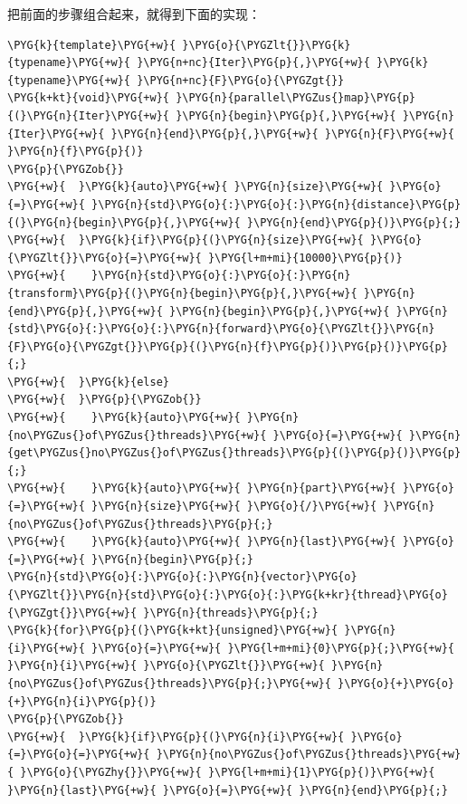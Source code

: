 
把前面的步骤组合起来，就得到下面的实现：



\begin{codeblockbg}
\begin{Verbatim}[commandchars=\\\{\},breaklines=true,breakanywhere=true,fontsize=\codefont,xleftmargin=17bp]
\PYG{k}{template}\PYG{+w}{ }\PYG{o}{\PYGZlt{}}\PYG{k}{typename}\PYG{+w}{ }\PYG{n+nc}{Iter}\PYG{p}{,}\PYG{+w}{ }\PYG{k}{typename}\PYG{+w}{ }\PYG{n+nc}{F}\PYG{o}{\PYGZgt{}}
\PYG{k+kt}{void}\PYG{+w}{ }\PYG{n}{parallel\PYGZus{}map}\PYG{p}{(}\PYG{n}{Iter}\PYG{+w}{ }\PYG{n}{begin}\PYG{p}{,}\PYG{+w}{ }\PYG{n}{Iter}\PYG{+w}{ }\PYG{n}{end}\PYG{p}{,}\PYG{+w}{ }\PYG{n}{F}\PYG{+w}{ }\PYG{n}{f}\PYG{p}{)}
\PYG{p}{\PYGZob{}}
\PYG{+w}{  }\PYG{k}{auto}\PYG{+w}{ }\PYG{n}{size}\PYG{+w}{ }\PYG{o}{=}\PYG{+w}{ }\PYG{n}{std}\PYG{o}{:}\PYG{o}{:}\PYG{n}{distance}\PYG{p}{(}\PYG{n}{begin}\PYG{p}{,}\PYG{+w}{ }\PYG{n}{end}\PYG{p}{)}\PYG{p}{;}
\PYG{+w}{  }\PYG{k}{if}\PYG{p}{(}\PYG{n}{size}\PYG{+w}{ }\PYG{o}{\PYGZlt{}}\PYG{o}{=}\PYG{+w}{ }\PYG{l+m+mi}{10000}\PYG{p}{)}
\PYG{+w}{    }\PYG{n}{std}\PYG{o}{:}\PYG{o}{:}\PYG{n}{transform}\PYG{p}{(}\PYG{n}{begin}\PYG{p}{,}\PYG{+w}{ }\PYG{n}{end}\PYG{p}{,}\PYG{+w}{ }\PYG{n}{begin}\PYG{p}{,}\PYG{+w}{ }\PYG{n}{std}\PYG{o}{:}\PYG{o}{:}\PYG{n}{forward}\PYG{o}{\PYGZlt{}}\PYG{n}{F}\PYG{o}{\PYGZgt{}}\PYG{p}{(}\PYG{n}{f}\PYG{p}{)}\PYG{p}{)}\PYG{p}{;}
\PYG{+w}{  }\PYG{k}{else}
\PYG{+w}{  }\PYG{p}{\PYGZob{}}
\PYG{+w}{    }\PYG{k}{auto}\PYG{+w}{ }\PYG{n}{no\PYGZus{}of\PYGZus{}threads}\PYG{+w}{ }\PYG{o}{=}\PYG{+w}{ }\PYG{n}{get\PYGZus{}no\PYGZus{}of\PYGZus{}threads}\PYG{p}{(}\PYG{p}{)}\PYG{p}{;}
\PYG{+w}{    }\PYG{k}{auto}\PYG{+w}{ }\PYG{n}{part}\PYG{+w}{ }\PYG{o}{=}\PYG{+w}{ }\PYG{n}{size}\PYG{+w}{ }\PYG{o}{/}\PYG{+w}{ }\PYG{n}{no\PYGZus{}of\PYGZus{}threads}\PYG{p}{;}
\PYG{+w}{    }\PYG{k}{auto}\PYG{+w}{ }\PYG{n}{last}\PYG{+w}{ }\PYG{o}{=}\PYG{+w}{ }\PYG{n}{begin}\PYG{p}{;}
\PYG{n}{std}\PYG{o}{:}\PYG{o}{:}\PYG{n}{vector}\PYG{o}{\PYGZlt{}}\PYG{n}{std}\PYG{o}{:}\PYG{o}{:}\PYG{k+kr}{thread}\PYG{o}{\PYGZgt{}}\PYG{+w}{ }\PYG{n}{threads}\PYG{p}{;}
\PYG{k}{for}\PYG{p}{(}\PYG{k+kt}{unsigned}\PYG{+w}{ }\PYG{n}{i}\PYG{+w}{ }\PYG{o}{=}\PYG{+w}{ }\PYG{l+m+mi}{0}\PYG{p}{;}\PYG{+w}{ }\PYG{n}{i}\PYG{+w}{ }\PYG{o}{\PYGZlt{}}\PYG{+w}{ }\PYG{n}{no\PYGZus{}of\PYGZus{}threads}\PYG{p}{;}\PYG{+w}{ }\PYG{o}{+}\PYG{o}{+}\PYG{n}{i}\PYG{p}{)}
\PYG{p}{\PYGZob{}}
\PYG{+w}{  }\PYG{k}{if}\PYG{p}{(}\PYG{n}{i}\PYG{+w}{ }\PYG{o}{=}\PYG{o}{=}\PYG{+w}{ }\PYG{n}{no\PYGZus{}of\PYGZus{}threads}\PYG{+w}{ }\PYG{o}{\PYGZhy{}}\PYG{+w}{ }\PYG{l+m+mi}{1}\PYG{p}{)}\PYG{+w}{ }\PYG{n}{last}\PYG{+w}{ }\PYG{o}{=}\PYG{+w}{ }\PYG{n}{end}\PYG{p}{;}

\end{Verbatim}
\end{codeblockbg}
